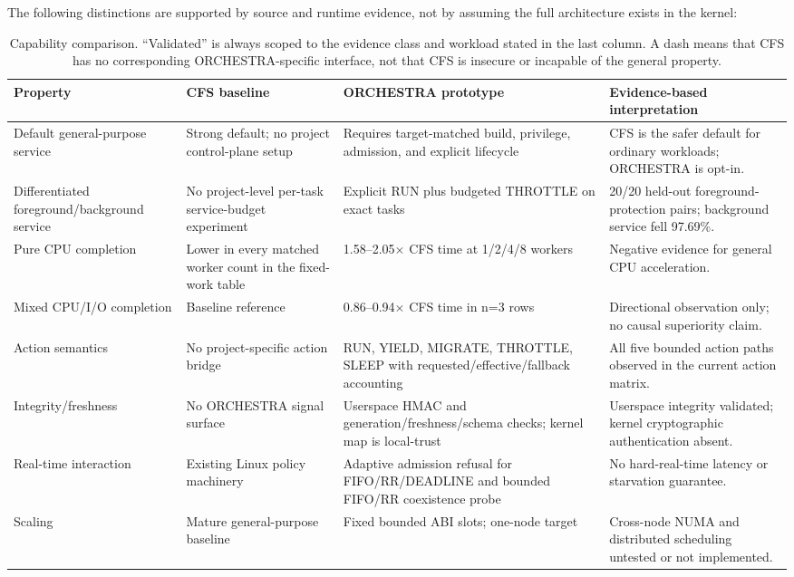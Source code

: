 \documentclass[10pt,letterpaper,twocolumn]{article}
\begin{document}
The following distinctions are supported by source and runtime evidence, not by assuming the full architecture exists in the kernel:

\begin{table}[t]
\centering\scriptsize
\caption{Capability comparison. ``Validated'' is always scoped to the evidence class and workload stated in the last column. A dash means that CFS has no corresponding ORCHESTRA-specific interface, not that CFS is insecure or incapable of the general property.}
\label{tab:comparison}
\begin{tabularx}{\textwidth}{p{}p{}p{}Y}
\toprule
Property & CFS baseline & ORCHESTRA prototype & Evidence-based interpretation \\
\midrule
Default general-purpose service & Strong default; no project control-plane setup & Requires target-matched build, privilege, admission, and explicit lifecycle & CFS is the safer default for ordinary workloads; ORCHESTRA is opt-in. \\
Differentiated foreground/background service & No project-level per-task service-budget experiment & Explicit RUN plus budgeted THROTTLE on exact tasks & 20/20 held-out foreground-protection pairs; background service fell 97.69\%. \\
Pure CPU completion & Lower in every matched worker count in the fixed-work table & 1.58--2.05$\times$ CFS time at 1/2/4/8 workers & Negative evidence for general CPU acceleration. \\
Mixed CPU/I/O completion & Baseline reference & 0.86--0.94$\times$ CFS time in n=3 rows & Directional observation only; no causal superiority claim. \\
Action semantics & No project-specific action bridge & RUN, YIELD, MIGRATE, THROTTLE, SLEEP with requested/effective/fallback accounting & All five bounded action paths observed in the current action matrix. \\
Integrity/freshness & No ORCHESTRA signal surface & Userspace HMAC and generation/freshness/schema checks; kernel map is local-trust & Userspace integrity validated; kernel cryptographic authentication absent. \\
Real-time interaction & Existing Linux policy machinery & Adaptive admission refusal for FIFO/RR/DEADLINE and bounded FIFO/RR coexistence probe & No hard-real-time latency or starvation guarantee. \\
Scaling & Mature general-purpose baseline & Fixed bounded ABI slots; one-node target & Cross-node NUMA and distributed scheduling untested or not implemented. \\
\bottomrule
\end{tabularx}
\end{table}
\end{document}
